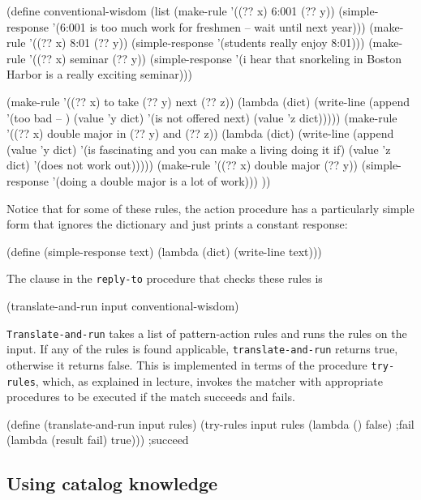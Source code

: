 \beginlisp
(define conventional-wisdom
  (list
   (make-rule '((?? x) 6:001 (?? y))
              (simple-response '(6:001 is too much work for freshmen
                                       -- wait until next year)))
   (make-rule '((?? x) 8:01 (?? y))
              (simple-response '(students really enjoy 8:01)))
   (make-rule '((?? x) seminar (?? y))
              (simple-response '(i hear that snorkeling in Boston Harbor
                                   is a really exciting seminar)))

   (make-rule '((?? x) to take (?? y) next (?? z))
              (lambda (dict)
                (write-line
                 (append '(too bad -- )
                         (value 'y dict)
                         '(is not offered next)
                         (value 'z dict)))))
   (make-rule '((?? x) double major in (?? y) and (?? z))
              (lambda (dict)
                (write-line
                 (append
                  (value 'y dict)
                  '(is fascinating and you can make a living doing it if)
                  (value 'z dict)
                  '(does not work out)))))
   (make-rule '((?? x) double major (?? y))
              (simple-response '(doing a double major is a lot of work)))
   ))
\endlisp

Notice that for some of these rules, the action procedure has a
particularly simple form that ignores the dictionary and just prints a
constant response:

\beginlisp
(define (simple-response text)
  (lambda (dict) (write-line text)))
\endlisp


The clause in the {\tt reply-to} procedure that checks these rules is

\beginlisp
(translate-and-run input conventional-wisdom)
\endlisp

\noindent
{\tt Translate-and-run} takes a list of pattern-action rules and runs
the rules on the input.  If any of the rules is found applicable,
{\tt translate-and-run} returns true, otherwise it returns false.
This is implemented in terms of the procedure {\tt try-rules}, which,
as explained in lecture, invokes the matcher with appropriate
procedures to be executed if the match succeeds and fails.

\beginlisp
(define (translate-and-run input rules)
  (try-rules input rules
             (lambda () false)              ;fail
             (lambda (result fail) true)))  ;succeed
\endlisp

\subsection{Using catalog knowledge}

